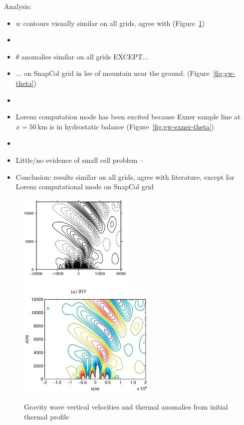 \documentclass[twocol]{ametsoc}
\begin{document}
Analysis:
\begin{itemize}
	\item $w$ contours visually similar on all grids, agree with \citet{melvin2010} (Figure~\ref{fig:gw-w})
	\item {}
	\item $\theta$ anomalies similar on all grids EXCEPT...
	\item ... on SnapCol grid in lee of mountain near the ground. (Figure~\ref{fig:gw-theta})
	\item {}
	\item Lorenz computation mode has been excited because Exner sample line at $x = \SI{50}{\kilo\meter}$ is in hydrostatic balance (Figure~\ref{fig:gw-exner-theta})
	\item {}
	\item Little/no evidence of small cell problem -- 
	\item Conclusion: results similar on all grids, agree with literature, except for Lorenz computational mode on SnapCol grid
\end{itemize}

\begin{figure}
	\includegraphics[height=2in]{gw-w-btf.png}
	\includegraphics[height=2in]{melvin-7a.png}
%
	\caption{Gravity wave vertical velocities and thermal anomalies from initial thermal profile}
	\label{fig:gw-w}
\end{figure}
\end{document}
